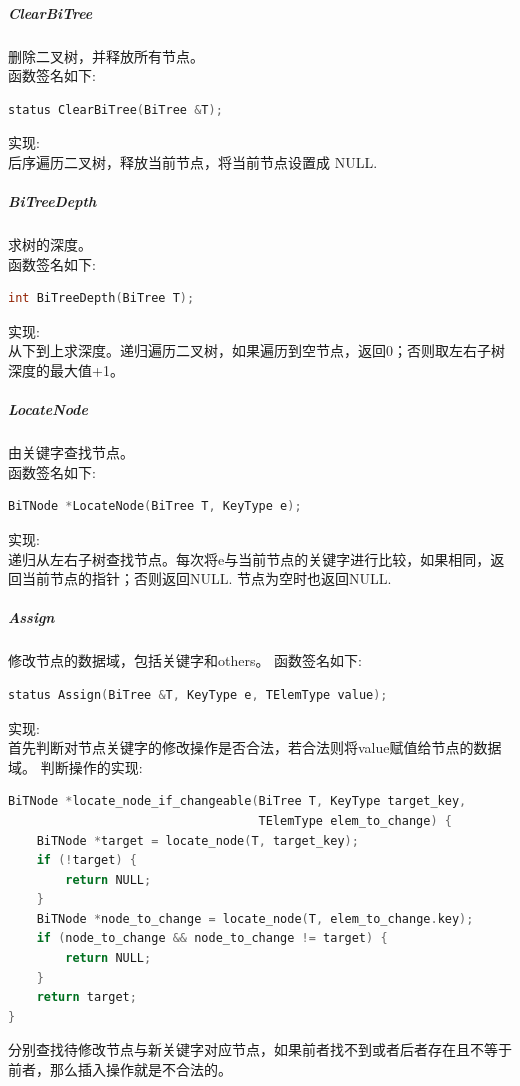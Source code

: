 \documentclass[supercite]{Experimental_Report}
\theoremstyle{definition}
\begin{document}
\subparagraph{ClearBiTree}
\noindent
删除二叉树，并释放所有节点。\\
函数签名如下:
\begin{lstlisting}[language=C++, frame=single]
status ClearBiTree(BiTree &T);
\end{lstlisting}
实现: \\
后序遍历二叉树，释放当前节点，将当前节点设置成 NULL. \\

\subparagraph{BiTreeDepth}
\noindent
求树的深度。 \\
函数签名如下:
\begin{lstlisting}[language=C++, frame=single]
int BiTreeDepth(BiTree T);
\end{lstlisting}
实现: \\
从下到上求深度。递归遍历二叉树，如果遍历到空节点，返回0；否则取左右子树深度的最大值+1。 \\

\subparagraph{LocateNode}
\noindent
由关键字查找节点。 \\
函数签名如下:
\begin{lstlisting}[language=C++, frame=single]
BiTNode *LocateNode(BiTree T, KeyType e);
\end{lstlisting}
实现: \\
递归从左右子树查找节点。每次将e与当前节点的关键字进行比较，如果相同，返回当前节点的指针；否则返回NULL. 节点为空时也返回NULL. \\

\subparagraph{Assign}
\noindent
修改节点的数据域，包括关键字和others。
函数签名如下:
\begin{lstlisting}[language=C++, frame=single]
status Assign(BiTree &T, KeyType e, TElemType value);
\end{lstlisting}
实现: \\
首先判断对节点关键字的修改操作是否合法，若合法则将value赋值给节点的数据域。
判断操作的实现: \\
\begin{lstlisting}[language=C++, frame=single]
BiTNode *locate_node_if_changeable(BiTree T, KeyType target_key,
								   TElemType elem_to_change) {
	BiTNode *target = locate_node(T, target_key);
	if (!target) {
		return NULL;
	}
	BiTNode *node_to_change = locate_node(T, elem_to_change.key);
	if (node_to_change && node_to_change != target) {
		return NULL;
	}
	return target;
}
\end{lstlisting}
分别查找待修改节点与新关键字对应节点，如果前者找不到或者后者存在且不等于前者，那么插入操作就是不合法的。
\end{document}
